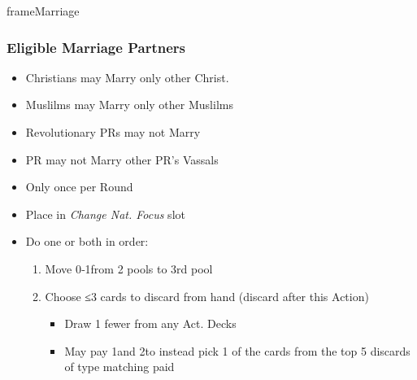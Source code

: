 \documentclass[10pt]{article}
\newlength{\fhMarriage} \setlength\fhMarriage{5\baselineskip}
\begin{document}
\begin{dynamiccontents*}{frameMarriage}\begin{eubox}{\fhMarriage}
	\subsubsection*{Eligible Marriage Partners }
	\begin{itemize}
		\item Christians may Marry only other Christ.
		\item Muslilms may Marry only other Muslilms
		\item Revolutionary PRs may not Marry
		\item PR may not Marry other PR's Vassals
	\end{itemize}
\end{eubox}\end{dynamiccontents*}

\begin{itemize}
	\item Only once per Round
	\item Place \cube in \emph{Change Nat. Focus} slot
	\item Do one or both in order:
	\begin{enumerate}
		\item Move 0‑1\monarchpower from 2 pools to 3rd pool
		\item Choose ≤3 cards to discard from hand (discard after this Action)
		\begin{itemize}
			\item Draw 1 fewer from any Act. Decks
			\item May pay 1\monarchpower and 2\ducats to instead pick 1 of the cards from the top 5 discards of type matching paid \monarchpower
		\end{itemize}
	\end{enumerate}
\end{itemize}
\end{document}
